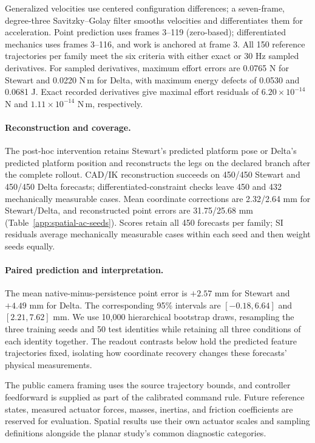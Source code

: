 Generalized velocities use centered configuration differences; a seven-frame, degree-three Savitzky--Golay filter smooths velocities and differentiates them for acceleration. Point prediction uses frames 3--119 (zero-based); differentiated mechanics uses frames 3--116, and work is anchored at frame 3. All 150 reference trajectories per family meet the six criteria with either exact or 30 Hz sampled derivatives. For sampled derivatives, maximum effort errors are 0.0765 N for Stewart and 0.0220 N\,m for Delta, with maximum energy defects of 0.0530 and 0.0681 J. Exact recorded derivatives give maximal effort residuals of $6.20\times10^{-14}$ N and $1.11\times10^{-14}$ N\,m, respectively.

\paragraph{Reconstruction and coverage.}
The post-hoc intervention retains Stewart's predicted platform pose or Delta's predicted platform position and reconstructs the legs on the declared branch after the complete rollout. CAD/IK reconstruction succeeds on 450/450 Stewart and 450/450 Delta forecasts; differentiated-constraint checks leave 450 and 432 mechanically measurable cases. Mean coordinate corrections are 2.32/2.64 mm for Stewart/Delta, and reconstructed point errors are 31.75/25.68 mm (Table~\ref{app:spatial-ac-seeds}). Scores retain all 450 forecasts per family; SI residuals average mechanically measurable cases within each seed and then weight seeds equally.

\paragraph{Paired prediction and interpretation.}
The mean native-minus-persistence point error is $+2.57$ mm for Stewart and $+4.49$ mm for Delta. The corresponding 95\% intervals are $[-0.18,6.64]$ and $[2.21,7.62]$ mm. We use 10,000 hierarchical bootstrap draws, resampling the three training seeds and 50 test identities while retaining all three conditions of each identity together. The readout contrasts below hold the predicted feature trajectories fixed, isolating how coordinate recovery changes these forecasts' physical measurements.

The public camera framing uses the source trajectory bounds, and controller feedforward is supplied as part of the calibrated command rule. Future reference states, measured actuator forces, masses, inertias, and friction coefficients are reserved for evaluation. Spatial results use their own actuator scales and sampling definitions alongside the planar study's common diagnostic categories.

